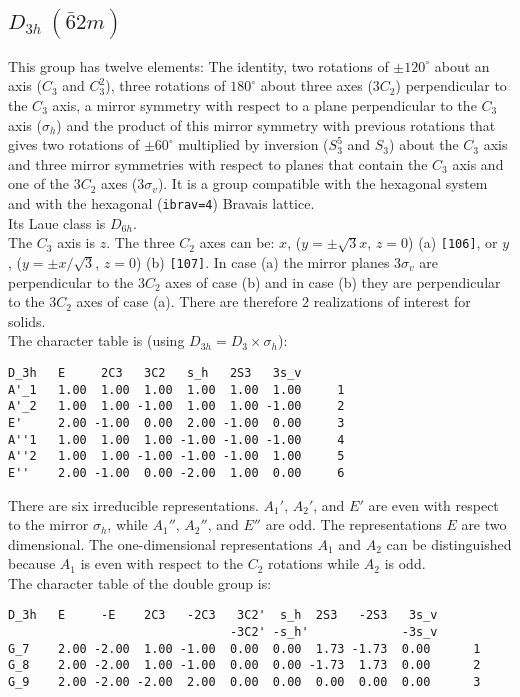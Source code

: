 \documentclass[12pt,a4paper]{article}
\begin{document}
\subsection{\color{web-blue}$D_{3h}\ (\bar 62m)$} 
This group has twelve elements: The identity, two rotations of $\pm120^\circ$
about an axis ($C_3$ and $C_3^2$), three rotations of $180^\circ$
about three axes ($3C_2$) perpendicular to the $C_3$ axis,
a mirror symmetry with respect to a plane perpendicular to the $C_3$ axis 
($\sigma_h$) and the product of this mirror symmetry with previous rotations
that gives two rotations of $\pm 60^\circ$ multiplied by inversion 
($S_3^5$ and $S_3$) about the $C_3$ axis and three mirror symmetries with respect 
to planes that contain the $C_3$ axis and one of the $3C_2$ axes
($3\sigma_v$). 
It is a group compatible with the hexagonal system 
and with the hexagonal (\texttt{ibrav=4}) Bravais lattice. \\
Its Laue class is $D_{6h}$. \\
The $C_3$ axis is $z$.
The three $C_2$ axes can be: $x$, ($y=\pm \sqrt{3} x$, $z=0$) (a) 
\texttt{[106]}, or
$y$, ($y=\pm x/\sqrt{3}$, $z=0$) (b) \texttt{[107]}. 
In case (a) the mirror planes 
$3\sigma_v$ are perpendicular to the $3C_2$ axes of case (b) and in case (b) 
they are perpendicular to the $3C_2$ axes of case (a).
There are therefore $2$ realizations of interest for solids. \\
The character table is (using $D_{3h}=D_3 \times \sigma_h$):
\begin{verbatim}
D_3h   E     2C3   3C2   s_h   2S3   3s_v 
A'_1   1.00  1.00  1.00  1.00  1.00  1.00     1
A'_2   1.00  1.00 -1.00  1.00  1.00 -1.00     2
E'     2.00 -1.00  0.00  2.00 -1.00  0.00     3
A''1   1.00  1.00  1.00 -1.00 -1.00 -1.00     4
A''2   1.00  1.00 -1.00 -1.00 -1.00  1.00     5
E''    2.00 -1.00  0.00 -2.00  1.00  0.00     6
\end{verbatim}
There are six irreducible representations. $A_1'$, $A_2'$, and $E'$ are
even with respect to the mirror $\sigma_h$, while
$A_1''$, $A_2''$, and $E''$ are odd. The representations $E$ are
two dimensional. The one-dimensional representations $A_1$ and $A_2$ can
be distinguished because $A_1$ is even with respect to the $C_2$ rotations
while $A_2$ is odd. \\
The character table of the double group is:
\begin{verbatim}
D_3h   E     -E    2C3   -2C3   3C2'  s_h  2S3   -2S3   3s_v
                               -3C2' -s_h'             -3s_v
G_7    2.00 -2.00  1.00 -1.00  0.00  0.00  1.73 -1.73  0.00      1
G_8    2.00 -2.00  1.00 -1.00  0.00  0.00 -1.73  1.73  0.00      2
G_9    2.00 -2.00 -2.00  2.00  0.00  0.00  0.00  0.00  0.00      3
\end{verbatim}
\end{document}
